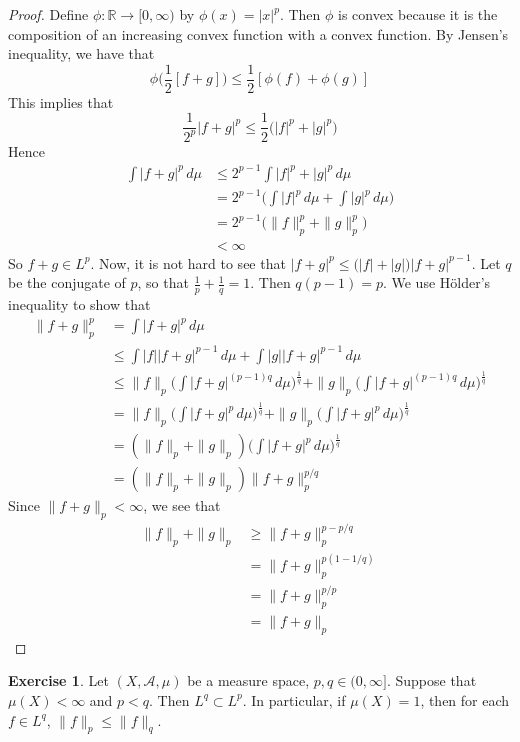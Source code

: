 \documentclass{book}
\theoremstyle{definition}
\newtheorem{ex}[definition]{Exercise}
\newcommand{\R}{\mathbb{R}}
\newcommand{\MA}{\mathcal{A}}
\newcommand{\lex}[1]{\label{ex:#1}}
\DeclareMathOperator*{\0}{\mbf{0}}
\DeclareMathOperator*{\1}{\mbf{1}}
\newcommand{\Rg}{[0,\infty)}
\newcommand{\dmu}{\, d \mu}
\begin{document}
	\begin{proof}
		Define $\phi:\R \rightarrow \Rg$ by $\phi(x) = | x |^p$. Then $\phi$ is convex because it is the composition of an increasing convex function with a convex function. By Jensen's inequality, we have that $$\phi\bigg(\frac{1}{2}[f+g] \bigg) \leq \frac{1}{2}[\phi(f)+\phi(g)]$$ 
		This implies that $$\frac{1}{2^p} | f+g|^p \leq \frac{1}{2}\bigg(| f|^p +| g |^p\bigg)$$ 
		Hence 
		\begin{align*}
			\int| f + g|^p \dmu 
			& \leq 2^{p-1}\int | f|^p +| g|^p \dmu \\
			& = 2^{p-1}\bigg(\int | f|^p \dmu + \int | g|^p \dmu \bigg) \\
			&= 2^{p-1}\bigg( \|f \|_p^p + \|g \|_p^p\bigg) \\
			& < \infty
		\end{align*}
		So $f+g \in L^p$. Now, it is not hard to see that $|f+g|^p \leq \big( |f| + |g| \big)|f+g|^{p-1}$. Let $q$ be the conjugate of $p$, so that $\frac{1}{p} + \frac{1}{q} = 1$. Then $q(p-1) = p$. We use Hölder's inequality to show that 
		\begin{align*}
			\|f+g \|_p ^p
			&= \int  |f+g|^p \dmu \\
			& \leq \int |f| |f+g|^{p-1} \dmu + \int |g| |f+g|^{p-1} \dmu \\
			& \leq \|f\|_p \bigg(\int |f+g|^{(p-1)q} \dmu\bigg)^{\frac{1}{q}} + \|g\|_p \bigg(\int |f+g|^{(p-1)q}\dmu\bigg)^{\frac{1}{q}} \\
			&= \|f\|_p \bigg(\int |f+g|^{p} \dmu\bigg)^{\frac{1}{q}} + \|g\|_p \bigg(\int |f+g|^{p}\dmu\bigg)^{\frac{1}{q}} \\ 
			&= (\|f\|_p + \|g \|_p) \bigg(\int |f+g|^{p} \dmu\bigg)^{\frac{1}{q}}\\
			&= (\|f \|_p + \|g \|_p) \|f+g \|_p^{p/q}
		\end{align*}
		Since $\|f+g \|_p < \infty$, we see that
		\begin{align*}
			\|f \|_p + \|g \|_p 
			& \geq \|f+g \|_p ^{p - p/q} \\
			&=  \|f+g \|_p ^{p(1 - 1/q)} \\
			&= \|f+g \|_p ^{p/p} \\
			&= \|f+g \|_p
		\end{align*}
	\end{proof}
	
	\begin{ex} \lex{00000} 
		Let $(X, \MA, \mu)$ be a measure space, $p,q \in (0, \infty]$. Suppose that $\mu(X) < \infty$ and $p < q$. Then $L^q \subset L^p$. In particular, if $\mu(X) = 1$, then for each $f \in L^q$, $\|f\|_p \leq \|f\|_q$.
	\end{ex}
	
\end{document}
